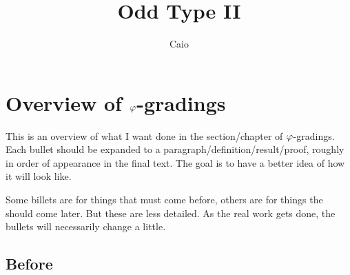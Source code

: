 \documentclass{amsbook}
\begin{document}


\author[Caio]{Caio}
\address{Department of Mathematics and Statistics,
	Memorial University of Newfoundland,
St. John's, NL, A1C5S7, Canada}




\date{}

\title{Odd Type II}








\chapter{Overview of $\varphi$-gradings}

This is an overview of what I want done in the section/chapter of $\varphi$-gradings. Each bullet should be expanded to a paragraph/definition/result/proof, roughly in order of appearance in the final text. The goal is to have a better idea of how it will look like.

Some billets are for things that must come before, others are for things the should come later. But these are less detailed. As the real work gets done, the bullets will necessarily change a little.

\section{Before}
\end{document}
